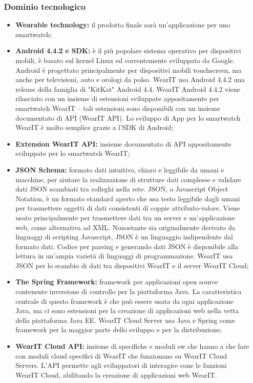 \subsubsection{Dominio tecnologico}
\begin{itemize}
\item \textbf{Wearable technology:} il prodotto finale sarà un'applicazione per uno smartwatch;
\item \textbf{Android 4.4.2 e SDK:} è il più popolare sistema operativo per dispositivi mobili, è basato sul kernel Linux ed correntemente sviluppato da Google. Android è progettato principalmente per dispositivi mobili touchscreen, ma anche per televisioni, auto e orologi da polso. WearIT usa Android 4.4.2 una release della famiglia di "KitKat" Android 4.4. WearIT Android 4.4.2 viene rilasciato con un insieme di estensioni sviluppate appositamente per smartwatch WearIT – tali estensioni sono disponibili con un insieme documentato di API (WearIT API). Lo sviluppo di App per lo smartwatch WearIT è molto semplice grazie a l'SDK di Android;
\item \textbf{Extension WearIT API:} insieme documentato di API appositamente sviluppate per lo smartwatch WearIT;
\item \textbf{JSON Schema:} formato dati intuitivo, chiaro e leggibile da umani e macchine, per aiutare la realizzazione di strutture dati complesse e validare dati JSON scambiati tra colleghi nella rete. 
JSON, o Javascript Object Notation, è un formato standard aperto che usa testo leggibile dagli umani per trasmettere oggetti di dati consistenti di coppie attributo-valore. Viene usato principalmente per trasmettere dati tra un server e un'applicazione web, come alternativa ad XML. 
Nonostante sia originalmente derivato da linguaggi di scripting Javascript, JSON è un linguaggio indipendente dal formato dati. Codice per parsing e generando dati JSON è disponibile alla lettura in un'ampia varietà di linguaggi di programmazione. WearIT usa JSON per lo scambio di dati tra dispositivi WearIT e il server WearIT Cloud;
\item \textbf{The Spring Framework:} framework per applicazioni open source contenente inversione di controllo per la piattaforma Java. La caratteristica centrale di questo framework è che può essere usata da ogni applicazione Java, ma ci sono estensioni per la creazione di applicazioni web nella vetta della piattaforma Java EE. WearIT Cloud Server usa Java e Spring come framework per la maggior parte dello sviluppo e per la distribuzione;
\item \textbf{WearIT Cloud API:} insieme di specifiche e moduli sw che hanno a che fare con moduli cloud specifici di WearIT che funzionano su WearIT Cloud Servers. L'API permette agli sviluppatori di interagire cone le funzioni WearIT Cloud, abilitando la creazione di applicazioni web WearIT.
\end{itemize}
 
